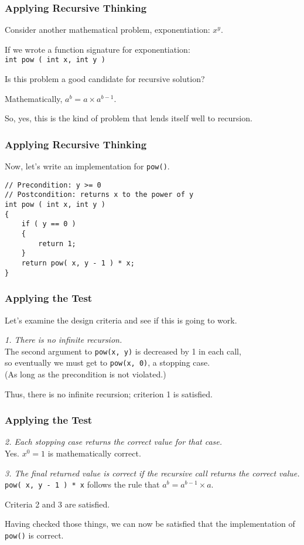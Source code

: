 \begin{frame}
\frametitle{Applying Recursive Thinking}
Consider another mathematical problem, exponentiation: $x^{y}$.

If we wrote a function signature for exponentiation:\\ \texttt{int pow ( int x, int y )}

Is this problem a good candidate for recursive solution?

Mathematically, $a^{b} = a \times a^{b-1}$.

So, yes, this is the kind of problem that lends itself well to recursion.


\end{frame}

\begin{frame}[fragile]
\frametitle{Applying Recursive Thinking}
Now, let's write an implementation for \texttt{pow()}.

\begin{verbatim}
// Precondition: y >= 0
// Postcondition: returns x to the power of y
int pow ( int x, int y )
{
    if ( y == 0 )
    {
        return 1;
    }
    return pow( x, y - 1 ) * x;
}
\end{verbatim}

\end{frame}

\begin{frame}
\frametitle{Applying the Test}
Let's examine the design criteria and see if this is going to work.

\textit{1. There is no infinite recursion.}\\
\quad The second argument to \texttt{pow(x, y)} is decreased by 1 in each call,\\ \quad so eventually we must get to \texttt{pow(x, 0)}, a stopping case.\\
\quad \quad (As long as the precondition is not violated.)

Thus, there is no infinite recursion; criterion 1 is satisfied.

\end{frame}

\begin{frame}
\frametitle{Applying the Test}

\textit{2. Each stopping case returns the correct value for that case.}\\
\quad Yes. $x^{0} = 1$ is mathematically correct.

\textit{3. The final returned value is correct if the recursive call returns the correct value.}\\
\quad \texttt{pow( x, y - 1 ) * x} follows the rule that $a^{b} = a^{b-1} \times a$.

Criteria 2 and 3 are satisfied.

Having checked those things, we can now be satisfied that the implementation of \texttt{pow()} is correct. 

\end{frame}

